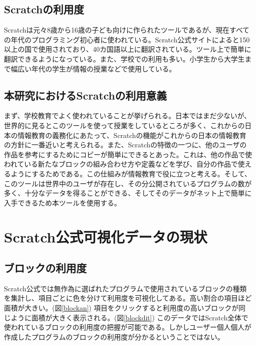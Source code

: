 \documentclass[a4paper,10pt,onecolumn,oneside,openany]{jsbook}
\begin{document}
\section{Scratchの利用度}
Scratchは元々8歳から16歳の子ども向けに作られたツールであるが、現在すべての年代のプログラミング初心者に使われている。Scratch公式サイト\cite{scratch_about}によると150以上の国で使用されており、40カ国語以上に翻訳されている。ツール上で簡単に翻訳できるようになっている。また、学校での利用も多い。小学生から大学生まで幅広い年代の学生が情報の授業などで使用している。
\section{本研究におけるScratchの利用意義}
まず、学校教育でよく使われていることが挙げられる。日本ではまだ少ないが、世界的に見るとこのツールを使って授業をしているところが多く、これからの日本の情報教育の義務化にあたって、Scratchの機能がこれからの日本の情報教育の方針に一番近いと考えられる。また、Scratchの特徴の一つに、他のユーザの作品を参考にするためにコピーが簡単にできるとあった。これは、他の作品で使われている新たなブロックの組み合わせ方や定義などを学び、自分の作品で使えるようにするためである。この仕組みが情報教育で役に立つと考える。そして、このツールは世界中のユーザが存在し、その分公開されているプログラムの数が多く、十分なデータを得ることができる、そしてそのデータがネット上で簡単に入手できるため本ツールを使用する。

\chapter{Scratch公式可視化データの現状}
\section{ブロックの利用度}

Scratch公式では無作為に選ばれたプログラムで使用されているブロックの種類を集計し、項目ごとに色を分けて利用度を可視化してある。高い割合の項目ほど面積が大きい。(図\ref{blockan})
 項目をクリックすると利用度の高いブロックが同じように面積が大きく表示される。(図\ref{blockdit}) このデータではScratch全体で使われているブロックの利用度の把握が可能である。しかしユーザー個人個人が作成したプログラムのブロックの利用度が分かるということではない。
 
\end{document}
